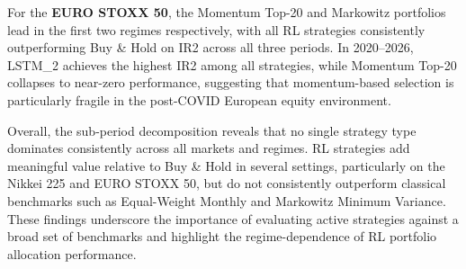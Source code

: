 \documentclass[]{elsarticle}
\begin{document}
For the \textbf{EURO STOXX 50}, the Momentum Top-20 and Markowitz portfolios lead in the first two regimes respectively, with all RL strategies consistently outperforming Buy \& Hold on IR2 across all three periods. In 2020--2026, LSTM\_2 achieves the highest IR2 among all strategies, while Momentum Top-20 collapses to near-zero performance, suggesting that momentum-based selection is particularly fragile in the post-COVID European equity environment.

Overall, the sub-period decomposition reveals that no single strategy type dominates consistently across all markets and regimes. RL strategies add meaningful value relative to Buy \& Hold in several settings, particularly on the Nikkei 225 and EURO STOXX 50, but do not consistently outperform classical benchmarks such as Equal-Weight Monthly and Markowitz Minimum Variance. These findings underscore the importance of evaluating active strategies against a broad set of benchmarks and highlight the regime-dependence of RL portfolio allocation performance.
\end{document}
